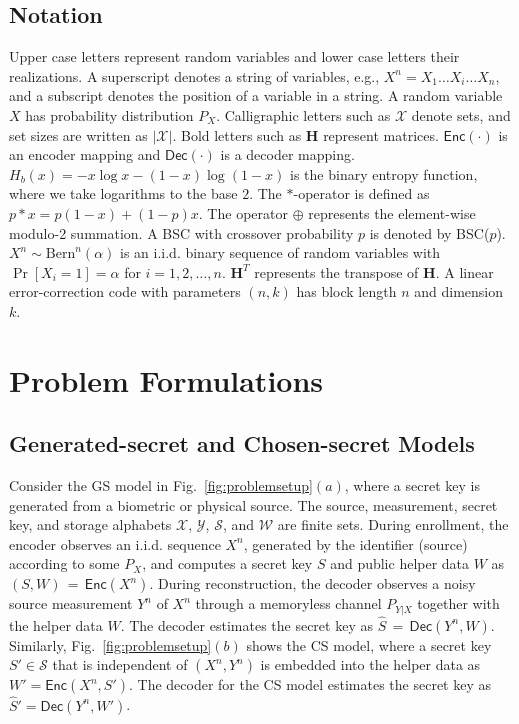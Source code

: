 \documentclass[journal,10pt,twoside]{IEEEtran}
\newcommand{\Enc}{\mathsf{Enc}}
\newcommand{\Dec}{\mathsf{Dec}}
\newcommand*\xor{\mathbin{\oplus}}
\begin{document}
\subsection{Notation}
Upper case letters represent random variables and lower case letters their realizations. A superscript denotes a string of variables, e.g., $\displaystyle X^n\!=\!X_1\ldots X_i\ldots X_n$, and a subscript denotes the position of a variable in a string. A random variable $\displaystyle X$ has probability distribution $\displaystyle P_X$. Calligraphic letters such as $\displaystyle \mathcal{X}$ denote sets, and set sizes are written as $\displaystyle |\mathcal{X}|$. Bold letters such as $\mathbf{H}$ represent matrices. $\Enc(\cdot)$ is an encoder mapping and $\Dec(\cdot)$ is a decoder mapping. $H_b(x)=-x\log x- (1-x)\log (1-x)$ is the binary entropy function, where we take logarithms to the base $2$. The $*$-operator is defined as $\displaystyle p*x = p(1-x)+(1-p)x$. The operator $\xor$ represents the element-wise modulo-2 summation. A BSC with crossover probability $p$ is denoted by BSC($p$). $X^n\sim\text{Bern}^n(\alpha)$ is an i.i.d. binary sequence of random variables with $\Pr[X_i=1]=\alpha$ for $i=1,2,\ldots,n$. ${\mathbf{H}}^T$ represents the transpose of $\mathbf{H}$. A linear error-correction code with parameters $(n,k)$ has block length $n$ and dimension $k$.

\section{Problem Formulations}\label{sec:problem_settingandcode}
\subsection{Generated-secret and Chosen-secret Models}\label{subsec:GSCSmodel} 
Consider the GS model in Fig.~\ref{fig:problemsetup}$(a)$, where a secret key is generated from a biometric or physical source. The source, measurement, secret key, and storage alphabets $\mathcal{X}$, $\mathcal{Y}$, $\mathcal{S}$, and $\mathcal{W}$ are finite sets. During enrollment, the encoder observes an i.i.d. sequence $X^n$, generated by the identifier (source) according to some $P_X$, and computes a secret key $S$ and public helper data $W$ as $\displaystyle (S,W)\,{=}\,{\Enc}(X^n)$. During reconstruction, the decoder observes a noisy source measurement $Y^n$ of $X^n$ through a memoryless channel $P_{Y|X}$ together with the helper data $W$. The decoder estimates the secret key as $\displaystyle \widehat{S}\,{=}\,{\Dec}(Y^n\!,W)$. Similarly, Fig.~\ref{fig:problemsetup}$(b)$ shows the CS model, where a secret key $S'\in\mathcal{S}$ that is independent of $(X^n,Y^n)$ is embedded into the helper data as $W' = \Enc(X^n,S')$. The decoder for the CS model estimates the secret key as $\widehat{S}'=\Dec(Y^n,W')$.
\end{document}
